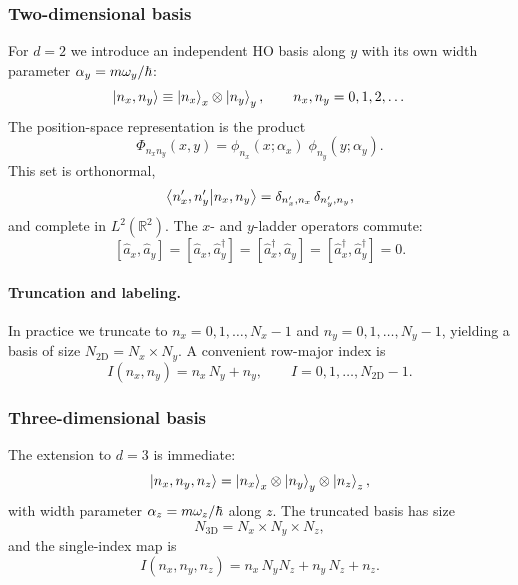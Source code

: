 \subsubsection{Two-dimensional basis}

For $d=2$ we introduce an independent HO basis along $y$ with its own width
parameter $\alpha_y = m\omega_y/\hbar$:
\begin{equation}\label{eq:2d_basis}
    \ket{n_x, n_y} \equiv \ket{n_x}_x \otimes \ket{n_y}_y,
    \qquad n_x, n_y = 0, 1, 2, \dots
\end{equation}
The position-space representation is the product
\begin{equation}
    \Phi_{n_x n_y}(x,y) = \phi_{n_x}(x;\alpha_x)\;\phi_{n_y}(y;\alpha_y).
\end{equation}
This set is orthonormal,
\begin{equation}\label{eq:2d_ortho}
    \braket{n'_x, n'_y}{n_x, n_y}
    = \delta_{n'_x,n_x}\,\delta_{n'_y,n_y},
\end{equation}
and complete in $L^2(\mathbb{R}^2)$.  The $x$- and $y$-ladder operators
commute:
\begin{equation}\label{eq:commuting_ladders}
    [\hat{a}_x, \hat{a}_y] = [\hat{a}_x, \hat{a}_y^\dagger]
    = [\hat{a}_x^\dagger, \hat{a}_y] = [\hat{a}_x^\dagger, \hat{a}_y^\dagger] = 0.
\end{equation}

\paragraph{Truncation and labeling.}
In practice we truncate to $n_x = 0, 1, \dots, N_x - 1$ and
$n_y = 0, 1, \dots, N_y - 1$, yielding a basis of size
$N_\mathrm{2D} = N_x \times N_y$.  A convenient row-major index is
\begin{equation}\label{eq:2d_index}
    I(n_x, n_y) = n_x \, N_y + n_y,
    \qquad I = 0, 1, \dots, N_\mathrm{2D} - 1.
\end{equation}

\subsubsection{Three-dimensional basis}

The extension to $d=3$ is immediate:
\begin{equation}\label{eq:3d_basis}
    \ket{n_x, n_y, n_z} = \ket{n_x}_x \otimes \ket{n_y}_y \otimes \ket{n_z}_z,
\end{equation}
with width parameter $\alpha_z = m\omega_z/\hbar$ along $z$.  The truncated
basis has size
\begin{equation}\label{eq:3d_size}
    N_\mathrm{3D} = N_x \times N_y \times N_z,
\end{equation}
and the single-index map is
\begin{equation}\label{eq:3d_index}
    I(n_x, n_y, n_z) = n_x\, N_y N_z + n_y\, N_z + n_z.
\end{equation}

